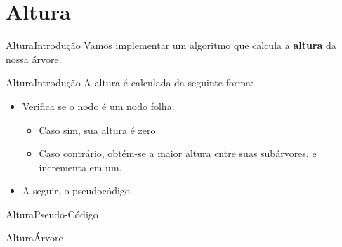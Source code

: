 \documentclass[aspectratio=169]{beamer}
\begin{document}
\section{Altura}

\begin{frame}{Altura}{Introdução}
Vamos implementar um algoritmo que calcula a {\bf altura} da nossa árvore.
\end{frame}


\begin{frame}{Altura}{Introdução}
A altura é calculada da seguinte forma:
 \begin{itemize}
 \item Verifica se o nodo é um nodo folha. 
 \begin{itemize}
 \item Caso sim, sua altura é zero.
 \item Caso contrário, obtém-se a maior altura entre suas subárvores, e incrementa em um.
 \end{itemize} 
 \item A seguir, o pseudocódigo.
 \end{itemize} 
\end{frame}


\begin{frame}{Altura}{Pseudo-Código}
\begin{algorithm}[H]
\caption{AlturaÁrvore} 
\label{AlturaArvore}
\end{algorithm}
\end{frame}


\end{document}
